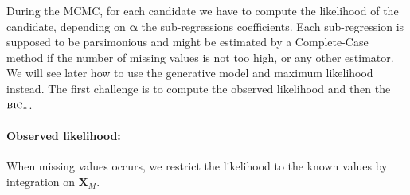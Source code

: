 \documentclass[12pt,a4paper]{report}
\begin{document}
	 During the MCMC, for each candidate we have to compute the likelihood of the candidate, depending on $\boldsymbol{\alpha}$ the sub-regressions coefficients. Each sub-regression is supposed to be parsimonious and might be estimated by a Complete-Case method if the number of missing values is not too high, or any other estimator. We will see later how to use the generative model and maximum likelihood instead. The first challenge is to compute the observed likelihood and then the $\textsc{bic}_*$. \\
	 

\paragraph{Observed likelihood:} 
%
	 When missing values occurs, we restrict the likelihood to the known values by integration on $\boldsymbol{X}_M$.
\end{document}
